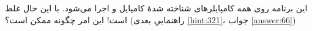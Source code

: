 \section{}
\paragraph{}\label{hint:228}
این برنامه روی همه کامپایلرهای شناخته شدهٔ  کامپایل و اجرا می‌شود. با این حال غلط است! این امر چگونه ممکن است؟ (راهنماییِ بعدی \ref{hint:321}، جواب \ref{answer:66})